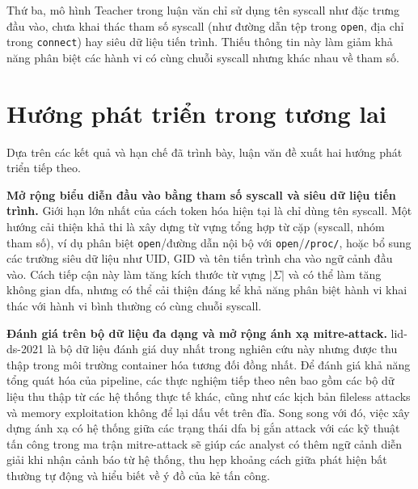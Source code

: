 \documentclass[../main.tex]{subfiles}
\begin{document}
Thứ ba, mô hình Teacher trong luận văn chỉ sử dụng tên \gls{syscall} như đặc trưng đầu vào,
chưa khai thác tham số \gls{syscall} (như đường dẫn tệp trong \texttt{open}, địa chỉ trong
\texttt{connect}) hay siêu dữ liệu tiến trình. Thiếu thông tin này làm giảm khả năng phân
biệt các hành vi có cùng chuỗi \gls{syscall} nhưng khác nhau về tham số.

\section{Hướng phát triển trong tương lai}
\label{sec:future_works}

Dựa trên các kết quả và hạn chế đã trình bày, luận văn đề xuất hai hướng phát triển tiếp
theo.

\textbf{Mở rộng biểu diễn đầu vào bằng tham số \gls{syscall} và siêu dữ liệu tiến trình.} Giới
hạn lớn nhất của cách token hóa hiện tại là chỉ dùng tên \gls{syscall}. Một hướng cải thiện
khả thi là xây dựng từ vựng tổng hợp từ cặp (\gls{syscall}, nhóm tham số), ví dụ phân biệt
\texttt{open}/đường dẫn nội bộ với \texttt{open}/\texttt{/proc/}, hoặc bổ sung các trường
siêu dữ liệu như UID, GID và tên tiến trình cha vào ngữ cảnh đầu vào. Cách tiếp cận này
làm tăng kích thước từ vựng $|\Sigma|$ và có thể làm tăng không gian \gls{dfa}, nhưng có thể
cải thiện đáng kể khả năng phân biệt hành vi khai thác với hành vi bình thường có cùng
chuỗi \gls{syscall}.

\textbf{Đánh giá trên bộ dữ liệu đa dạng và mở rộng ánh xạ \gls{mitre-attack}.} \gls{lid-ds}-2021
là bộ dữ liệu đánh giá duy nhất trong nghiên cứu này nhưng được thu thập trong môi trường container hóa tương đối
đồng nhất. Để đánh giá khả năng tổng quát hóa của pipeline, các thực nghiệm tiếp theo
nên bao gồm các bộ dữ liệu thu thập từ các hệ thống thực tế khác, cũng như các kịch bản
fileless attacks và memory exploitation không để lại dấu vết trên đĩa. Song song với đó,
việc xây dựng ánh xạ có hệ thống giữa các trạng thái \gls{dfa} bị gắn attack với các kỹ thuật
tấn công trong ma trận \gls{mitre-attack} sẽ giúp các analyst có thêm ngữ cảnh diễn giải khi
nhận cảnh báo từ hệ thống, thu hẹp khoảng cách giữa phát hiện bất thường tự động và hiểu
biết về ý đồ của kẻ tấn công.
\end{document}
